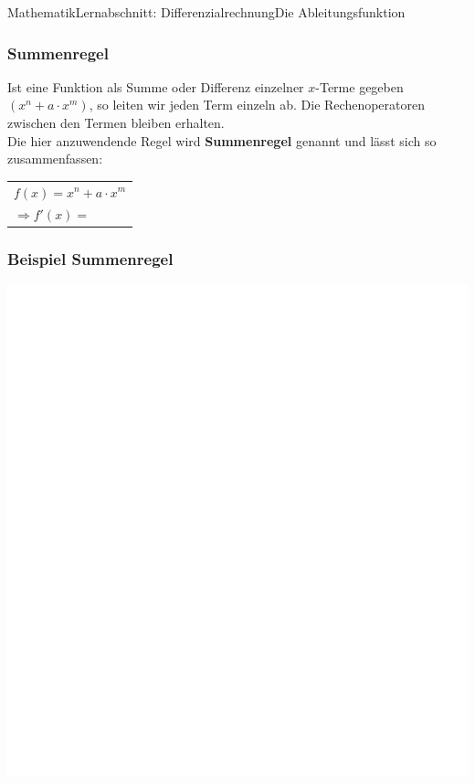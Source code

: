 \documentclass[11pt,twocolumn,oneside,openany,headings=optiontotoc,11pt,numbers=noenddot]{article}
\begin{document}
\begin{worksheet}{Mathematik}{Lernabschnitt: Differenzialrechnung}{Die Ableitungsfunktion}
		\subsubsection{Summenregel}
		Ist eine Funktion als Summe oder Differenz einzelner \(x\)-Terme gegeben \((x^n + a\cdot x^m)\), so leiten wir jeden Term einzeln ab. Die Rechenoperatoren zwischen den Termen bleiben erhalten.\\
		Die hier anzuwendende Regel wird \textbf{Summenregel} genannt und lässt sich so zusammenfassen:
		\begin{framed}
			\noindent
			\begin{tabularx}{0.8\textwidth}{X}
				\(f(x) = x^n + a\cdot x^m\)\\
				\(\Rightarrow f'(x) = \)
			\end{tabularx}
		\end{framed}
	
		\subsubsection*{Beispiel Summenregel}
		\includegraphics[scale=0.2]{../../empty.jpg}\\
		\\

\end{worksheet}
\end{document}
